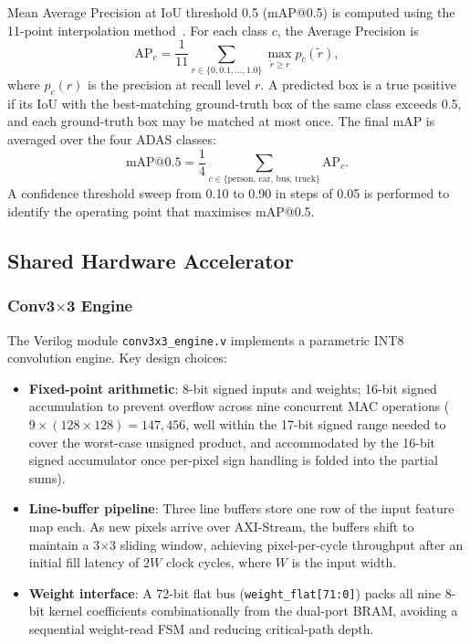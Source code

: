 \documentclass[conference]{IEEEtran}
\begin{document}
Mean Average Precision at IoU threshold 0.5 (mAP@0.5) is computed using the 11-point interpolation method~\cite{everingham2010voc}. For each class $c$, the Average Precision is
\begin{equation}
\text{AP}_c = \frac{1}{11}\sum_{r \in \{0, 0.1, \ldots, 1.0\}} \max_{\tilde{r} \geq r} p_c(\tilde{r}),
\end{equation}
where $p_c(r)$ is the precision at recall level $r$. A predicted box is a true positive if its IoU with the best-matching ground-truth box of the same class exceeds 0.5, and each ground-truth box may be matched at most once. The final mAP is averaged over the four ADAS classes:
\begin{equation}
\text{mAP@0.5} = \frac{1}{4}\sum_{c \in \{\text{person, car, bus, truck}\}} \text{AP}_c.
\end{equation}
A confidence threshold sweep from 0.10 to 0.90 in steps of 0.05 is performed to identify the operating point that maximises mAP@0.5.

\subsection{Shared Hardware Accelerator}

\subsubsection{Conv3$\times$3 Engine}

The Verilog module \texttt{conv3x3\_engine.v} implements a parametric INT8 convolution engine. Key design choices:
\begin{itemize}
    \item \textbf{Fixed-point arithmetic}: 8-bit signed inputs and weights; 16-bit signed accumulation to prevent overflow across nine concurrent MAC operations ($9 \times (128 \times 128) = 147{,}456$, well within the 17-bit signed range needed to cover the worst-case unsigned product, and accommodated by the 16-bit signed accumulator once per-pixel sign handling is folded into the partial sums).
    \item \textbf{Line-buffer pipeline}: Three line buffers store one row of the input feature map each. As new pixels arrive over AXI-Stream, the buffers shift to maintain a 3$\times$3 sliding window, achieving pixel-per-cycle throughput after an initial fill latency of $2W$ clock cycles, where $W$ is the input width.
    \item \textbf{Weight interface}: A 72-bit flat bus (\texttt{weight\_flat[71:0]}) packs all nine 8-bit kernel coefficients combinationally from the dual-port BRAM, avoiding a sequential weight-read FSM and reducing critical-path depth.
\end{itemize}
\end{document}

